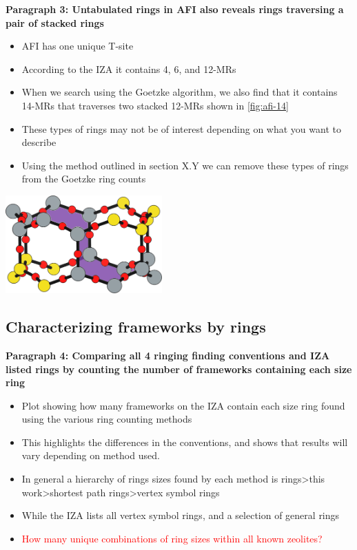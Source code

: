 \documentclass[11pt]{article}
\newcommand{\red}[1]{\textcolor{red}{#1}}
\begin{document}
\textbf{\textbf{Paragraph 3: Untabulated rings in AFI also reveals rings traversing a pair of stacked rings}}
\begin{itemize}
\item AFI has one unique T-site
\item According to the IZA it contains 4, 6, and 12-MRs
\item When we search using the Goetzke algorithm, we also find that it contains 14-MRs that traverses two stacked 12-MRs shown in \cref{fig:afi-14}
\item These types of rings may not be of interest depending on what you want to describe
\item Using the method outlined in section X.Y we can remove these types of rings from the Goetzke ring counts
\end{itemize}
\begin{center}
\includegraphics[width=0.45\textwidth]{../figures/completed-figures/afi-14.pdf}
\end{center}

\subsection{Characterizing frameworks by rings}
\label{sec:org90a7fd6}
\textbf{\textbf{Paragraph 4: Comparing all 4 ringing finding conventions and IZA listed rings by counting the number of frameworks containing each size ring}}
\begin{itemize}
\item Plot showing how many frameworks on the IZA contain each size ring found using the various ring counting methods
\item This highlights the differences in the conventions, and shows that results will vary depending on method used.
\item In general a hierarchy of rings sizes found by each method is rings>this work>shortest path rings>vertex symbol rings
\item While the IZA lists all vertex symbol rings, and a selection of general rings
\item \red{How many unique combinations of ring sizes within all known zeolites?}
\end{itemize}
\end{document}
